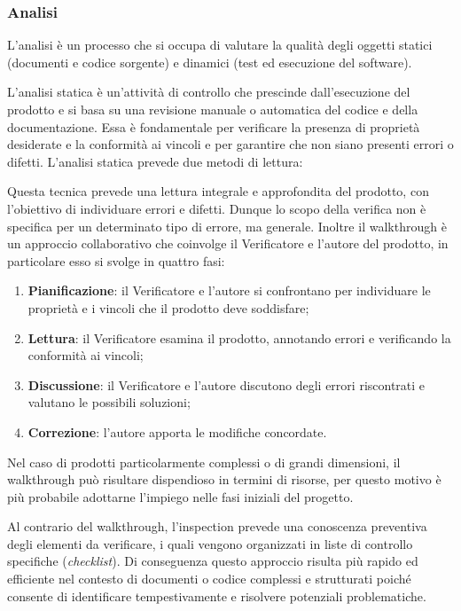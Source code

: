 \subsubsection{Analisi}
L'analisi è un processo che si occupa di valutare la qualità degli oggetti statici (documenti e codice sorgente) e dinamici
(test ed esecuzione del software).

L'analisi statica è un'attività di controllo che prescinde dall'esecuzione del prodotto e si basa su una revisione manuale o automatica
del codice e della documentazione. Essa è fondamentale per verificare la presenza di proprietà desiderate e la conformità ai vincoli e
per garantire che non siano presenti errori o difetti. L'analisi statica prevede due metodi di lettura:

Questa tecnica prevede una lettura integrale e approfondita del prodotto, con l'obiettivo di individuare errori e difetti. Dunque lo scopo della verifica
non è specifica per un determinato tipo di errore, ma generale. Inoltre il walkthrough è un approccio collaborativo che coinvolge il Verificatore
e l'autore del prodotto, in particolare esso si svolge in quattro fasi:
\begin{enumerate}
	\item \textbf{Pianificazione}: il Verificatore e l'autore si confrontano per individuare le proprietà e i vincoli che il prodotto deve soddisfare;
	\item \textbf{Lettura}: il Verificatore esamina il prodotto, annotando errori e verificando la conformità ai vincoli;
	\item \textbf{Discussione}: il Verificatore e l'autore discutono degli errori riscontrati e valutano le possibili soluzioni;
	\item \textbf{Correzione}: l'autore apporta le modifiche concordate.
\end{enumerate}
Nel caso di prodotti particolarmente complessi o di grandi dimensioni, il walkthrough può risultare dispendioso in termini di risorse,
per questo motivo è più probabile adottarne l'impiego nelle fasi iniziali del progetto.

Al contrario del walkthrough, l'inspection prevede una conoscenza preventiva degli elementi da verificare, i quali vengono organizzati in
liste di controllo specifiche (\textit{checklist}). Di conseguenza questo approccio risulta più rapido ed efficiente nel contesto di documenti
o codice complessi e strutturati poiché consente di identificare tempestivamente e risolvere potenziali problematiche.

